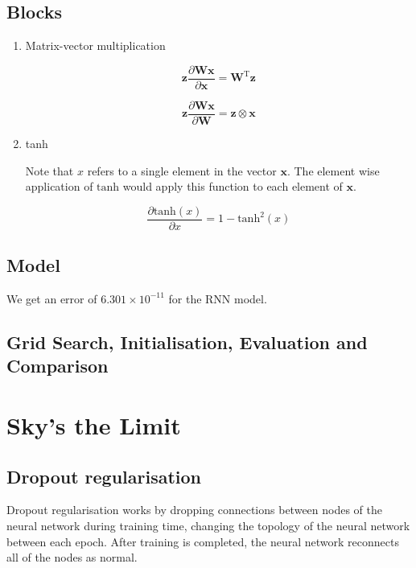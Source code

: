 \documentclass{article} %
\begin{document}
\subsection{Blocks}

\begin{enumerate}

\item Matrix-vector multiplication

\[\mathbf{z} \frac{\partial \mathbf{W} \mathbf{x}}{\partial \mathbf{x}}  = \mathbf{W}^{\text{T}} \mathbf{z}\]

\[\mathbf{z} \frac{\partial \mathbf{W} \mathbf{x}}{\partial \mathbf{W}}  = \mathbf{z} \otimes \mathbf{x}\]

\item tanh

Note that $x$ refers to a single element in the vector $\mathbf{x}$. The element wise application of $\text{tanh}$ would apply this function to each element of $\mathbf{x}$.

\[ \frac{\partial \text{tanh}(x)}{\partial x} = 1 - \text{tanh}^2(x) \]

\end{enumerate}

\subsection{Model}

We get an error of $6.301 \times 10^{-11}$ for the RNN model.

\subsection{Grid Search, Initialisation, Evaluation and Comparison}

\section{Sky's the Limit}

\subsection{Dropout regularisation}

Dropout regularisation works by dropping connections between nodes of the neural network during training time, changing the topology of the neural network between each epoch. After training is completed, the neural network reconnects all of the nodes as normal.
\end{document}
